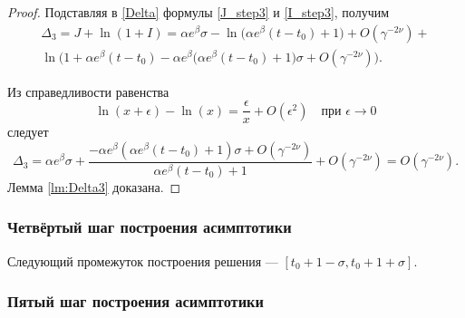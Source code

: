 \begin{proof}
Подставляя в \eqref{Delta} формулы \eqref{J_step3}  и \eqref{I_step3}, получим
\begin{multline}
	\label{eq:Delta_step3}
	\Delta_3=J+\ln(1+I)=\alpha e^{\beta}\sigma-\ln\big(\alpha e^{\beta}(t-t_0)+1\big)+O(\gamma^{-2\nu})+\\ \ln\Big(1+\alpha e^{\beta}(t-t_0)-\alpha e^{\beta}\big(\alpha e^{\beta}(t-t_0)+1\big)\sigma+O(\gamma^{-2\nu})\Big).
\end{multline}

Из справедливости равенства
%
\[\ln(x+\epsilon)-\ln(x) = \frac{\epsilon}{x} + O(\epsilon^2) \quad \text{при } \epsilon \to 0\]
%
следует
\[
\Delta_3 = \alpha e^{\beta}\sigma + \frac{-\alpha e^{\beta}(\alpha e^{\beta}(t - t_0) + 1)\sigma + O(\gamma^{-2\nu})}{\alpha e^{\beta}(t-t_0)+1} + O(\gamma^{-2\nu}) = O(\gamma^{-2\nu}).
\]
Лемма \ref{lm:Delta3} доказана.
\end{proof}

\subsubsection{Четвёртый шаг построения асимптотики}

Следующий промежуток построения решения --- $[t_0 + 1 -\sigma, t_0 + 1 + \sigma]$.



\subsubsection{Пятый шаг построения асимптотики}

